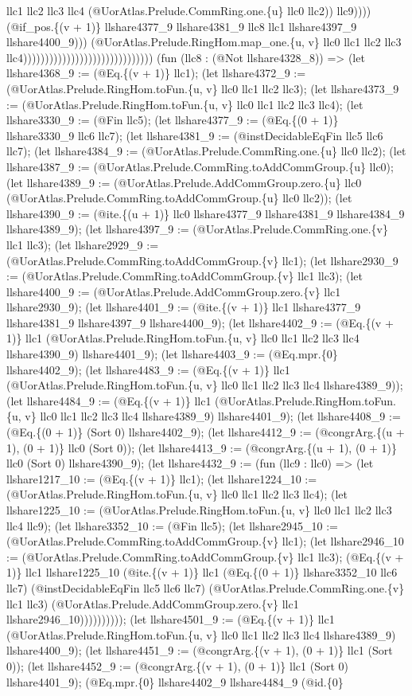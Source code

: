 \documentclass[11pt]{article}
\begin{document}
llc1 llc2 llc3 llc4 (@UorAtlas.Prelude.CommRing.one.\{u\} llc0 llc2)) llc9)))) (@if\_pos.\{(v + 1)\} llshare4377\_9 llshare4381\_9 llc8 llc1 llshare4397\_9 llshare4400\_9))) (@UorAtlas.Prelude.RingHom.map\_one.\{u, v\} llc0 llc1 llc2 llc3 llc4)))))))))))))))))))))))))))))) (fun (llc8 : (@Not llshare4328\_8)) => (let llshare4368\_9 := (@Eq.\{(v + 1)\} llc1); (let llshare4372\_9 := (@UorAtlas.Prelude.RingHom.toFun.\{u, v\} llc0 llc1 llc2 llc3); (let llshare4373\_9 := (@UorAtlas.Prelude.RingHom.toFun.\{u, v\} llc0 llc1 llc2 llc3 llc4); (let llshare3330\_9 := (@Fin llc5); (let llshare4377\_9 := (@Eq.\{(0 + 1)\} llshare3330\_9 llc6 llc7); (let llshare4381\_9 := (@instDecidableEqFin llc5 llc6 llc7); (let llshare4384\_9 := (@UorAtlas.Prelude.CommRing.one.\{u\} llc0 llc2); (let llshare4387\_9 := (@UorAtlas.Prelude.CommRing.toAddCommGroup.\{u\} llc0); (let llshare4389\_9 := (@UorAtlas.Prelude.AddCommGroup.zero.\{u\} llc0 (@UorAtlas.Prelude.CommRing.toAddCommGroup.\{u\} llc0 llc2)); (let llshare4390\_9 := (@ite.\{(u + 1)\} llc0 llshare4377\_9 llshare4381\_9 llshare4384\_9 llshare4389\_9); (let llshare4397\_9 := (@UorAtlas.Prelude.CommRing.one.\{v\} llc1 llc3); (let llshare2929\_9 := (@UorAtlas.Prelude.CommRing.toAddCommGroup.\{v\} llc1); (let llshare2930\_9 := (@UorAtlas.Prelude.CommRing.toAddCommGroup.\{v\} llc1 llc3); (let llshare4400\_9 := (@UorAtlas.Prelude.AddCommGroup.zero.\{v\} llc1 llshare2930\_9); (let llshare4401\_9 := (@ite.\{(v + 1)\} llc1 llshare4377\_9 llshare4381\_9 llshare4397\_9 llshare4400\_9); (let llshare4402\_9 := (@Eq.\{(v + 1)\} llc1 (@UorAtlas.Prelude.RingHom.toFun.\{u, v\} llc0 llc1 llc2 llc3 llc4 llshare4390\_9) llshare4401\_9); (let llshare4403\_9 := (@Eq.mpr.\{0\} llshare4402\_9); (let llshare4483\_9 := (@Eq.\{(v + 1)\} llc1 (@UorAtlas.Prelude.RingHom.toFun.\{u, v\} llc0 llc1 llc2 llc3 llc4 llshare4389\_9)); (let llshare4484\_9 := (@Eq.\{(v + 1)\} llc1 (@UorAtlas.Prelude.RingHom.toFun.\{u, v\} llc0 llc1 llc2 llc3 llc4 llshare4389\_9) llshare4401\_9); (let llshare4408\_9 := (@Eq.\{(0 + 1)\} (Sort 0) llshare4402\_9); (let llshare4412\_9 := (@congrArg.\{(u + 1), (0 + 1)\} llc0 (Sort 0)); (let llshare4413\_9 := (@congrArg.\{(u + 1), (0 + 1)\} llc0 (Sort 0) llshare4390\_9); (let llshare4432\_9 := (fun (llc9 : llc0) => (let llshare1217\_10 := (@Eq.\{(v + 1)\} llc1); (let llshare1224\_10 := (@UorAtlas.Prelude.RingHom.toFun.\{u, v\} llc0 llc1 llc2 llc3 llc4); (let llshare1225\_10 := (@UorAtlas.Prelude.RingHom.toFun.\{u, v\} llc0 llc1 llc2 llc3 llc4 llc9); (let llshare3352\_10 := (@Fin llc5); (let llshare2945\_10 := (@UorAtlas.Prelude.CommRing.toAddCommGroup.\{v\} llc1); (let llshare2946\_10 := (@UorAtlas.Prelude.CommRing.toAddCommGroup.\{v\} llc1 llc3); (@Eq.\{(v + 1)\} llc1 llshare1225\_10 (@ite.\{(v + 1)\} llc1 (@Eq.\{(0 + 1)\} llshare3352\_10 llc6 llc7) (@instDecidableEqFin llc5 llc6 llc7) (@UorAtlas.Prelude.CommRing.one.\{v\} llc1 llc3) (@UorAtlas.Prelude.AddCommGroup.zero.\{v\} llc1 llshare2946\_10)))))))))); (let llshare4501\_9 := (@Eq.\{(v + 1)\} llc1 (@UorAtlas.Prelude.RingHom.toFun.\{u, v\} llc0 llc1 llc2 llc3 llc4 llshare4389\_9) llshare4400\_9); (let llshare4451\_9 := (@congrArg.\{(v + 1), (0 + 1)\} llc1 (Sort 0)); (let llshare4452\_9 := (@congrArg.\{(v + 1), (0 + 1)\} llc1 (Sort 0) llshare4401\_9); (@Eq.mpr.\{0\} llshare4402\_9 llshare4484\_9 (@id.\{0\} 
\end{document}
